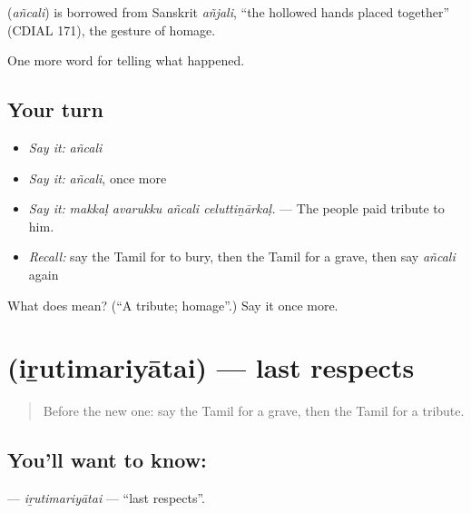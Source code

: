 \begin{cousinweb}
\textbf{} (\emph{añcali}) is borrowed from Sanskrit \emph{añjali}, \textquotedblleft{}the hollowed hands placed together\textquotedblright{} (CDIAL 171), the gesture of homage.
\end{cousinweb}

\begin{grammarlens}[title={What you've built}]
One more word for telling what happened.
\end{grammarlens}

\subsection*{Your turn}
\begin{itemize}
\raggedright
  \item \emph{Say it:} \emph{añcali}
  \item \emph{Say it:} \emph{añcali}, once more
  \item \emph{Say it:} \emph{makkaḷ avarukku añcali celuttiṉārkaḷ.} — The people paid tribute to him.
  \item \emph{Recall:} say the Tamil for to bury, then the Tamil for a grave, then say \emph{añcali} again
\end{itemize}

\begin{tcolorbox}[breakable,colback=teal!4,colframe=teal!35!black,title={Before you move on}]
What does  mean? (\textquotedblleft{}A tribute; homage\textquotedblright{}.) Say it once more.
\end{tcolorbox}
\section[\texorpdfstring{\ta{இறுதிமரியாதை} (iṟutimariyātai)}{இறுதிமரியாதை (iṟutimariyātai)}]{ (iṟutimariyātai) — last respects}

\label{lesson:TA-C324-irutimariyatai}



\begin{quote}
Before the new one: say the Tamil for a grave, then the Tamil for a tribute.
\end{quote}

\subsection*{You'll want to know: }
\textbf{} — \emph{iṟutimariyātai} — \textquotedblleft{}last respects\textquotedblright{}.

